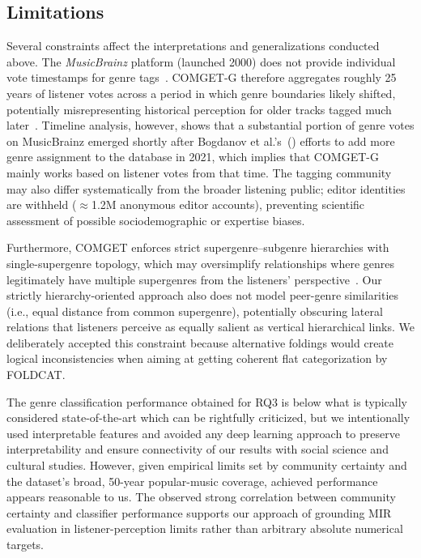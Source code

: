 \documentclass{article}
\begin{document}
\subsection{Limitations}

Several constraints affect the interpretations and generalizations conducted above. The \textit{MusicBrainz} platform (launched 2000) does not provide individual vote timestamps for genre tags~\citep{MusicBrainz_nodate}.  COMGET-G therefore aggregates roughly 25 years of listener votes across a period in which genre boundaries likely shifted, potentially misrepresenting historical perception for older tracks tagged much later~\citep{nieInaccuratePredictionGenre2022}. Timeline analysis, however, shows that a substantial portion of genre votes on MusicBrainz emerged shortly after Bogdanov et al.'s~(\citeyear{bogdanovAcousticbrainzGenreDataset2019}) efforts to  add more genre assignment to the database in 2021, which implies that COMGET-G mainly works based on listener votes from that time. The tagging community may also differ systematically from the broader listening public; editor identities are withheld ($\approx$1.2M anonymous editor accounts), preventing scientific assessment of  possible sociodemographic or expertise biases. 

Furthermore, COMGET enforces strict supergenre–subgenre hierarchies with single-supergenre topology, which may oversimplify relationships where genres legitimately have multiple supergenres from the listeners' perspective~\citep{schreiberGenreOntologyLearning2016}.  Our strictly hierarchy-oriented approach also does not model peer-genre similarities (i.e., equal distance from common supergenre), potentially obscuring lateral relations that listeners perceive as equally salient as vertical hierarchical links. We deliberately accepted this constraint because alternative foldings would create logical inconsistencies when aiming at getting coherent flat categorization by FOLDCAT.

The genre classification performance obtained for RQ3 is below what is typically considered state-of-the-art which can be rightfully criticized, but we intentionally used interpretable features and avoided any deep learning approach to preserve  interpretability and  ensure connectivity of our results with social science and cultural studies. However, given empirical limits set by community certainty and the dataset’s broad, 50-year popular-music coverage, achieved performance appears reasonable to us. The observed strong correlation between community certainty and classifier performance supports our approach of grounding MIR evaluation in listener-perception limits rather than arbitrary absolute numerical targets.
\end{document}
